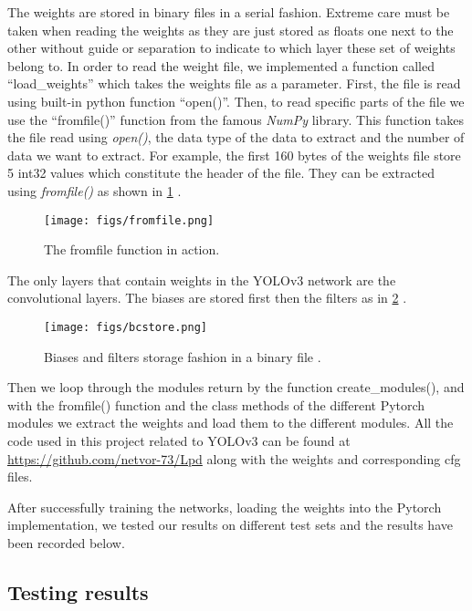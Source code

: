 The weights are stored in binary files in a serial fashion. Extreme care must be taken when reading the weights
as they are just stored as floats one next to the other without guide or separation to indicate to which layer
these set of weights belong to. In order to read the weight file, we implemented a function called ``load\_weights''
which takes the weights file as a parameter. First, the file is read using built-in python function ``open()''.
Then, to read specific parts of the file we use the ``fromfile()'' function from the famous \emph{NumPy} library. This function
takes the file read using \emph{open()}, the data type of the data to extract and the number of data we want to extract.
For example, the first 160 bytes of the weights file store 5 int32 values which constitute the header of the file. They can be
extracted using \emph{fromfile()} as shown in \cref{fig:fromfile} \cite{}.

\begin{figure}[!htpb]
	\centering
	\texttt{[image: figs/fromfile.png]}
	\caption{The fromfile function in action.}
	\label{fig:fromfile}
\end{figure}

The only layers that contain weights in the YOLOv3 network are the convolutional layers. The biases are
stored first then the filters as in \cref{fig:bcstore} \cite{binary}.

\begin{figure}[!htpb]
	\centering
	\texttt{[image: figs/bcstore.png]}
	\caption{Biases and filters storage fashion in a binary file \cite{binary}.}
	\label{fig:bcstore}
\end{figure}

Then we loop through the modules return by the function create\_modules(), and with the fromfile() function
and the class methods of the different Pytorch modules we extract the weights and load them to the different modules. All the code used in this project related to YOLOv3 can be found at \url{https://github.com/netvor-73/Lpd} along with the weights and corresponding cfg files.

After successfully training the networks, loading the weights into the Pytorch implementation, we tested our
results on different test sets and the results have been recorded below.


\subsection{Testing results}
